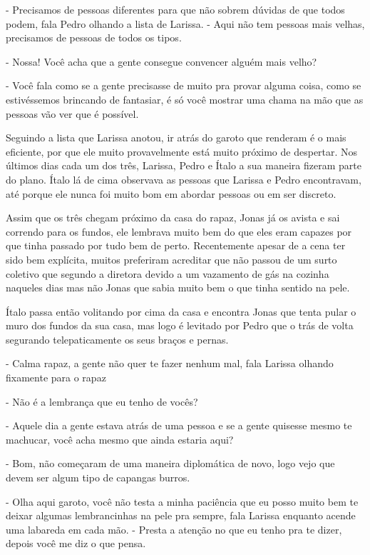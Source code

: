 - Precisamos de pessoas diferentes para que não sobrem dúvidas de que todos podem, fala Pedro olhando a lista de Larissa. - Aqui não tem pessoas mais velhas, precisamos de pessoas de todos os tipos.

- Nossa! Você acha que a gente consegue convencer alguém mais velho?

- Você fala como se a gente precisasse de muito pra provar alguma coisa, como se estivéssemos brincando de fantasiar, é só você mostrar uma chama na mão que as pessoas vão ver que é possível.


Seguindo a lista que Larissa anotou, ir atrás do garoto que renderam é o mais eficiente, por que ele muito provavelmente está muito próximo de despertar. Nos últimos dias cada um dos três, Larissa, Pedro e Ítalo a sua maneira fizeram parte do plano. Ítalo lá de cima observava as pessoas que Larissa e Pedro encontravam, até porque ele nunca foi muito bom em abordar pessoas ou em ser discreto.

Assim que os três chegam próximo da casa do rapaz, Jonas já os avista e sai correndo para os fundos, ele lembrava muito bem do que eles eram capazes por que tinha passado por tudo bem de perto. Recentemente apesar de a cena ter sido bem explícita, muitos preferiram acreditar que não passou de um surto coletivo que segundo a diretora devido a um vazamento de gás na cozinha naqueles dias mas não Jonas que sabia muito bem o que tinha sentido na pele.

Ítalo passa então volitando por cima da casa e encontra Jonas que tenta pular o muro dos fundos da sua casa, mas logo é levitado por Pedro que o trás de volta segurando telepaticamente os seus braços e pernas.

- Calma rapaz, a gente não quer te fazer nenhum mal, fala Larissa olhando fixamente para o rapaz

- Não é a lembrança que eu tenho de vocês?

- Aquele dia a gente estava atrás de uma pessoa e se a gente quisesse mesmo te machucar, você acha mesmo que ainda estaria aqui?

- Bom, não começaram de uma maneira diplomática de novo, logo vejo que devem ser algum tipo de capangas burros.

- Olha aqui garoto, você não testa a minha paciência que eu posso muito bem te deixar algumas lembrancinhas na pele pra sempre, fala Larissa enquanto acende uma labareda em cada mão. - Presta a atenção no que eu tenho pra te dizer, depois você me diz o que pensa.


